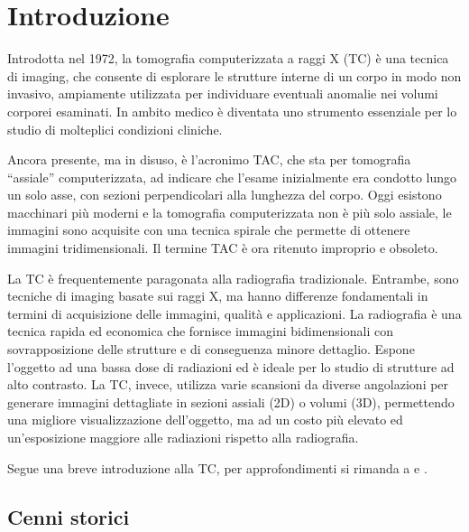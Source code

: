 \documentclass[12pt,a4paper]{report}
\begin{document}
\pagestyle{fancy}
\tableofcontents
\clearpage

\pagestyle{fancy}
\newpage
{}

\chapter{Introduzione} \label{chap:intro}

Introdotta nel 1972, la tomografia computerizzata a raggi X (TC) è una tecnica di imaging, che consente di esplorare le strutture
interne di un corpo in modo non invasivo, ampiamente utilizzata per individuare eventuali anomalie nei volumi corporei esaminati.
In ambito medico è diventata uno strumento essenziale per lo studio di molteplici condizioni cliniche.

Ancora presente, ma in disuso, è l'acronimo TAC, che sta per tomografia ``assiale'' computerizzata, ad indicare che l'esame
inizialmente era condotto lungo un solo asse, con sezioni perpendicolari alla lunghezza del corpo.
Oggi esistono macchinari più moderni e la tomografia computerizzata non è più solo assiale, le immagini sono acquisite con una
tecnica spirale che permette di ottenere immagini tridimensionali.
Il termine TAC è ora ritenuto improprio e obsoleto.

La TC è frequentemente paragonata alla radiografia tradizionale.
Entrambe, sono tecniche di imaging basate sui raggi X, ma hanno differenze fondamentali in termini di acquisizione delle immagini,
qualità e applicazioni.
La radiografia è una tecnica rapida ed economica che fornisce immagini bidimensionali con sovrapposizione delle strutture e di
conseguenza minore dettaglio.
Espone l'oggetto ad una bassa dose di radiazioni ed è ideale per lo studio di strutture ad alto contrasto.
La TC, invece, utilizza varie scansioni da diverse angolazioni per generare immagini dettagliate in sezioni assiali (2D) o volumi
(3D), permettendo una migliore visualizzazione dell'oggetto, ma ad un costo più elevato ed un'esposizione maggiore alle radiazioni
rispetto alla radiografia.

Segue una breve introduzione alla TC, per approfondimenti si rimanda a \cite{Faggioni2011} e \cite{MoroLoli2021}.

\section{Cenni storici}
\end{document}
